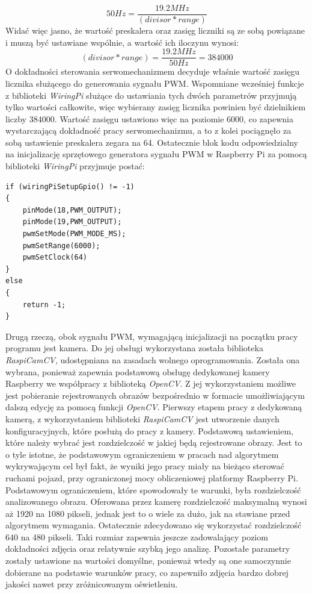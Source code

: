 \begin{equation}
50 Hz = \frac{19.2 MHz}{(divisor * range)}
\label{eq:hard_pwmN}
\end{equation}
Widać więc jasno, że wartość preskalera oraz zasięg liczniki są ze sobą powiązane i muszą być ustawiane wspólnie, a wartość ich iloczynu wynosi:
\begin{equation}
(divisor * range) = \frac{19.2 MHz}{50 Hz} = 384000
\label{eq:range_x_presc}
\end{equation}
O dokładności sterowania serwomechanizmem decyduje właśnie wartość zasięgu licznika służącego do generowania sygnału PWM. Wspomniane wcześniej funkcje z biblioteki \textit{WiringPi} służące do ustawiania tych dwóch parametrów przyjmują tylko wartości całkowite, więc wybierany zasięg licznika powinien być dzielnikiem liczby $384000$. Wartość zasięgu ustawiono więc na poziomie 6000, co zapewnia wystarczającą dokładność pracy serwomechanizmu, a to z kolei pociągnęło za sobą ustawienie preskalera zegara na 64. Ostatecznie blok kodu odpowiedzialny na inicjalizację sprzętowego generatora sygnału PWM w Raspberry Pi za pomocą biblioteki \textit{WiringPi} przyjmuje postać:
\begin{lstlisting}
if (wiringPiSetupGpio() != -1)
{
	pinMode(18,PWM_OUTPUT);
	pinMode(19,PWM_OUTPUT);
	pwmSetMode(PWM_MODE_MS);
	pwmSetRange(6000);
	pwmSetClock(64)
}
else
{
	return -1;
}
\end{lstlisting}

Drugą rzeczą, obok sygnału PWM, wymagającą inicjalizacji na początku pracy programu jest kamera. Do jej obsługi wykorzystana została biblioteka \textit{RaspiCamCV}, udostępniana na zasadach wolnego oprogramowania. Została ona wybrana, ponieważ zapewnia podstawową obsługę dedykowanej kamery Raspberry we współpracy z biblioteką \textit{OpenCV}. Z jej wykorzystaniem możliwe jest pobieranie rejestrowanych obrazów bezpośrednio w formacie umożliwiającym dalszą edycję za pomocą funkcji \textit{OpenCV}. Pierwszy etapem pracy z dedykowaną kamerą, z wykorzystaniem biblioteki \textit{RaspiCamCV} jest utworzenie danych konfiguracyjnych, które posłużą do pracy z kamery. Podstawową ustawieniem, które należy wybrać jest rozdzielczość w jakiej będą rejestrowane obrazy. Jest to o tyle istotne, że podstawowym ograniczeniem w pracach nad algorytmem wykrywającym cel był fakt, że wyniki jego pracy miały na bieżąco sterować ruchami pojazd, przy ograniczonej mocy obliczeniowej platformy Raspberry Pi. Podstawowym ograniczeniem, które spowodowały te warunki, była rozdzielczość analizowanego obrazu. Oferowana przez kamerę rozdzielczość maksymalną wynosi aż 1920 na 1080 pikseli, jednak jest to o wiele za dużo, jak na stawiane przed algorytmem wymagania. Ostatecznie zdecydowano się wykorzystać rozdzielczość 640 na 480 pikseli. Taki rozmiar zapewnia jeszcze zadowalający poziom dokładności zdjęcia oraz relatywnie szybką jego analizę. Pozostałe parametry zostały ustawione na wartości domyślne, ponieważ wtedy są one samoczynnie dobierane na podstawie warunków pracy, co zapewniło zdjęcia bardzo dobrej jakości nawet przy zróżnicowanym oświetleniu.

